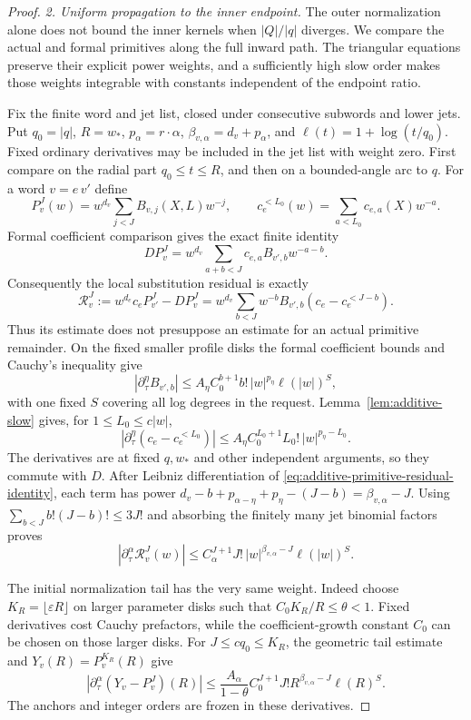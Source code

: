 \begin{proof}
\emph{2. Uniform propagation to the inner endpoint.}
The outer normalization alone does not bound the inner kernels when
$|Q|/|q|$ diverges.  We compare the actual and formal primitives along
the full inward path.  The triangular equations preserve their explicit
power weights, and a sufficiently high slow order makes those weights
integrable with constants independent of the endpoint ratio.

Fix the finite word and jet list, closed under
consecutive subwords and lower jets.  Put $q_0=|q|$, $R=w_*$,
$p_\alpha=r\cdot\alpha$, $\beta_{v,\alpha}=d_v+p_\alpha$, and
$\ell(t)=1+\log(t/q_0)$.  Fixed ordinary derivatives may be included
in the jet list with weight zero.  First compare on the radial part
$q_0\le t\le R$, and then on a bounded-angle arc to $q$.
For a word $v=e\,v'$ define
\[
 P_v^J(w)=w^{d_v}\sum_{j<J}B_{v,j}(X,L)w^{-j},\qquad
 c_e^{<L_0}(w)=\sum_{a<L_0}c_{e,a}(X)w^{-a}.
\]
Formal coefficient comparison gives the exact finite identity
\[
 DP_v^J=w^{d_v}\sum_{a+b<J}c_{e,a}B_{v',b}w^{-a-b}.
\]
Consequently the local substitution residual is exactly
\begin{equation}\label{eq:additive-primitive-residual-identity}
 \mathcal R_v^J:=w^{d_e}c_eP_{v'}^J-DP_v^J
 =w^{d_v}\sum_{b<J}w^{-b}B_{v',b}
                  (c_e-c_e^{<J-b}).
\end{equation}
Thus its estimate does not presuppose an estimate for an actual
primitive remainder.  On the fixed smaller profile disks the formal
coefficient bounds and Cauchy's inequality give
\[
 |\partial_\tau^\eta B_{v',b}|
 \le A_\eta C_0^{b+1}b!\,|w|^{p_\eta}\ell(|w|)^S,
\]
with one fixed $S$ covering all log degrees in the request.
Lemma~\ref{lem:additive-slow} gives, for $1\le L_0\le c|w|$,
\[
 |\partial_\tau^\eta(c_e-c_e^{<L_0})|
 \le A_\eta C_0^{L_0+1}L_0!\,|w|^{p_\eta-L_0}.
\]
The derivatives are at fixed $q,w_*$ and other independent arguments,
so they commute with $D$.  After Leibniz differentiation of
\eqref{eq:additive-primitive-residual-identity}, each term has power
$d_v-b+p_{\alpha-\eta}+p_\eta-(J-b)=\beta_{v,\alpha}-J$.
Using $\sum_{b<J}b!(J-b)!\le3J!$ and absorbing the finitely many jet
binomial factors proves
\begin{equation}\label{eq:additive-primitive-residual}
 |\partial_\tau^\alpha\mathcal R_v^J(w)|
 \le C_\alpha^{J+1}J!\,
       |w|^{\beta_{v,\alpha}-J}\ell(|w|)^S.
\end{equation}

The initial normalization tail has the very same weight.  Indeed
choose $K_R=\lfloor\varepsilon R\rfloor$ on larger parameter disks
such that $C_0K_R/R\le\theta<1$.  Fixed derivatives cost Cauchy
prefactors, while the coefficient-growth constant $C_0$ can be chosen
on those larger disks.  For $J\le cq_0\le K_R$, the geometric tail
estimate and $Y_v(R)=P_v^{K_R}(R)$ give
\begin{equation}\label{eq:additive-primitive-initial-tail}
 \left|\partial_\tau^\alpha(Y_v-P_v^J)(R)\right|
 \le\frac{A_\alpha}{1-\theta}C_0^{J+1}J!
        R^{\beta_{v,\alpha}-J}\ell(R)^S.
\end{equation}
The anchors and integer orders are frozen in these derivatives.


\end{proof}
